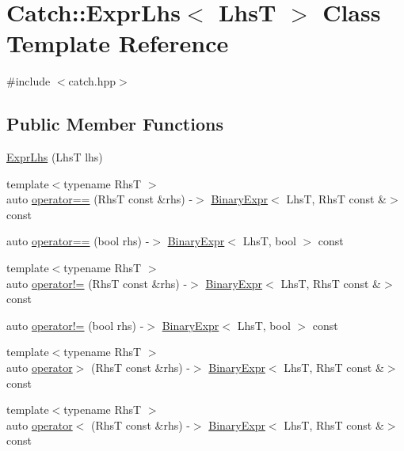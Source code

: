 \hypertarget{classCatch_1_1ExprLhs}{}\section{Catch\+:\+:Expr\+Lhs$<$ LhsT $>$ Class Template Reference}
\label{classCatch_1_1ExprLhs}


{\ttfamily \#include $<$catch.\+hpp$>$}

\subsection*{Public Member Functions}
\begin{DoxyCompactItemize}
\item 
\mbox{\hyperlink{classCatch_1_1ExprLhs_ad22c6af1a7d6993240624d299714a479}{Expr\+Lhs}} (LhsT lhs)
\item 
{\footnotesize template$<$typename RhsT $>$ }\\auto \mbox{\hyperlink{classCatch_1_1ExprLhs_a3068adff1dbbaeec62ffc368d4d6cc4d}{operator==}} (RhsT const \&rhs) -\/$>$ \mbox{\hyperlink{classCatch_1_1BinaryExpr}{Binary\+Expr}}$<$ LhsT, RhsT const \&$>$ const
\item 
auto \mbox{\hyperlink{classCatch_1_1ExprLhs_ab707a84abdffbdc35962a495e238d393}{operator==}} (bool rhs) -\/$>$ \mbox{\hyperlink{classCatch_1_1BinaryExpr}{Binary\+Expr}}$<$ LhsT, bool $>$ const
\item 
{\footnotesize template$<$typename RhsT $>$ }\\auto \mbox{\hyperlink{classCatch_1_1ExprLhs_a5e10eab8aed53dd000b89d8fd7754437}{operator!=}} (RhsT const \&rhs) -\/$>$ \mbox{\hyperlink{classCatch_1_1BinaryExpr}{Binary\+Expr}}$<$ LhsT, RhsT const \&$>$ const
\item 
auto \mbox{\hyperlink{classCatch_1_1ExprLhs_a60eca847201d057d8a8b7222c69b619c}{operator!=}} (bool rhs) -\/$>$ \mbox{\hyperlink{classCatch_1_1BinaryExpr}{Binary\+Expr}}$<$ LhsT, bool $>$ const
\item 
{\footnotesize template$<$typename RhsT $>$ }\\auto \mbox{\hyperlink{classCatch_1_1ExprLhs_a23cb0cd983a1ac9c3df5160542199b83}{operator$>$}} (RhsT const \&rhs) -\/$>$ \mbox{\hyperlink{classCatch_1_1BinaryExpr}{Binary\+Expr}}$<$ LhsT, RhsT const \&$>$ const
\item 
{\footnotesize template$<$typename RhsT $>$ }\\auto \mbox{\hyperlink{classCatch_1_1ExprLhs_a55284221df2edb3542e765c87b5691b9}{operator$<$}} (RhsT const \&rhs) -\/$>$ \mbox{\hyperlink{classCatch_1_1BinaryExpr}{Binary\+Expr}}$<$ LhsT, RhsT const \&$>$ const

\end{DoxyCompactItemize}
